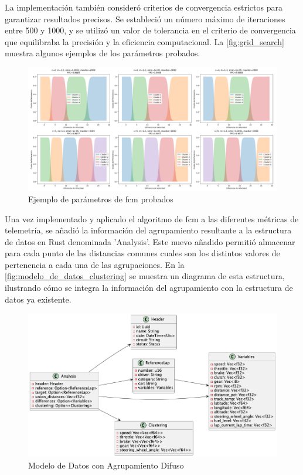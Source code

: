 La implementación también consideró criterios de convergencia estrictos para garantizar resultados precisos. Se estableció un número máximo de iteraciones entre 500 y 1000, y se utilizó un valor de tolerancia en el criterio de convergencia que equilibraba la precisión y la eficiencia computacional. La \autoref{fig:grid_search} muestra algunos ejemplos de los parámetros probados.

\begin{figure}[H]
	\centering
	\includegraphics[width=1\linewidth]{./figs/herramientas/desarrollo/grid_search.png}
	\caption[Ejemplo de parámetros de \ac{fcm} probados]{Ejemplo de parámetros de \ac{fcm} probados}
    \label{fig:grid_search}
\end{figure}
\vspace{2em}

Una vez implementado y aplicado el algoritmo de \ac{fcm} a las diferentes métricas de telemetría, se añadió la información del agrupamiento resultante a la estructura de datos en Rust denominada 'Analysis'. Este nuevo añadido permitió almacenar para cada punto de las distancias comunes cuales son los distintos valores de pertenencia a cada una de las agrupaciones. En la \autoref{fig:modelo_de_datos_clustering} se muestra un diagrama de esta estructura, ilustrando cómo se integra la información del agrupamiento con la estructura de datos ya existente.

\begin{figure}[H]
	\centering
	\includegraphics[width=1\linewidth]{./figs/herramientas/desarrollo/modelo_de_datos_clustering.png}
	\caption[Modelo de Datos con Agrupamiento Difuso]{Modelo de Datos con Agrupamiento Difuso}
    \label{fig:modelo_de_datos_clustering}
\end{figure}





